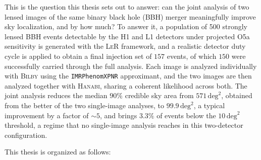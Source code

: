 This is the question this thesis sets out to answer: can the joint analysis of two lensed images of the same binary black hole (BBH) merger meaningfully improve sky localization, and by how much? To answer it, a population of \num{500} strongly lensed BBH events detectable by the H1 and L1 detectors under projected O5a sensitivity is generated with the \textsc{LeR} framework, and a realistic detector duty cycle is applied to obtain a final injection set of $157$ events, of which $150$ were successfully carried through the full analysis. Each image is analyzed individually with \textsc{Bilby} using the \texttt{IMRPhenomXPNR} approximant, and the two images are then analyzed together with \textsc{Hanabi}, sharing a coherent likelihood across both. The joint analysis reduces the median $90\%$ credible sky area from $\num{571}\,\mathrm{deg}^2$, obtained from the better of the two single-image analyses, to $\num{99.9}\,\mathrm{deg}^2$, a typical improvement by a factor of $\sim 5$, and brings $3.3\%$ of events below the $10\,\mathrm{deg}^2$ threshold, a regime that no single-image analysis reaches in this two-detector configuration.

This thesis is organized as follows:

